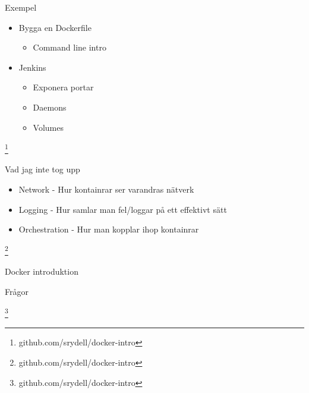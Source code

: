 \documentclass[12pt]{beamer}
\newcommand\blfootnote[1]{%
  \begingroup
  \renewcommand\thefootnote{}\footnote{#1}%
  \addtocounter{footnote}{-1}%
  \endgroup
}
\begin{document}
\begin{frame}{Exempel}
     \begin{itemize}
         \item Bygga en Dockerfile
         \begin{itemize}
             \item Command line intro
         \end{itemize}
         \item Jenkins
         \begin{itemize}
             \item Exponera portar
             \item Daemons
             \item Volumes
         \end{itemize}
     \end{itemize}
     \blfootnote{github.com/srydell/docker-intro}
\end{frame}

\begin{frame}{Vad jag inte tog upp}
    \begin{itemize}
        \item Network - Hur kontainrar ser varandras nätverk
        \item Logging - Hur samlar man fel/loggar på ett effektivt sätt
        \item Orchestration - Hur man kopplar ihop kontainrar
    \end{itemize}
     \blfootnote{github.com/srydell/docker-intro}
\end{frame}

\begin{frame}{Docker introduktion}
    \begin{center}
    \LARGE Frågor
    \end{center}
    \blfootnote{github.com/srydell/docker-intro}
\end{frame}
\end{document}
